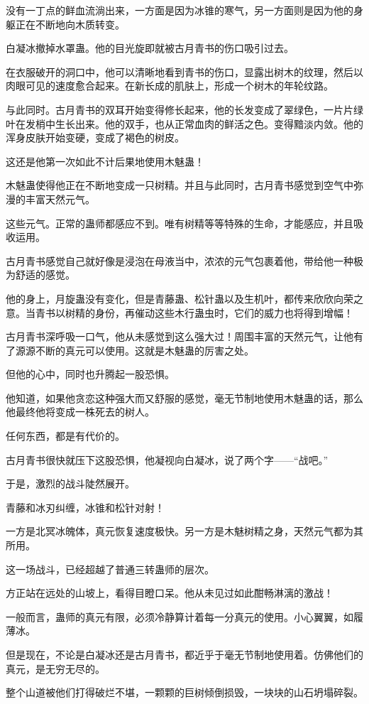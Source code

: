 \begin{this_body}
没有一丁点的鲜血流淌出来，一方面是因为冰锥的寒气，另一方面则是因为他的身躯正在不断地向木质转变。

白凝冰撤掉水罩蛊。他的目光旋即就被古月青书的伤口吸引过去。

在衣服破开的洞口中，他可以清晰地看到青书的伤口，显露出树木的纹理，然后以肉眼可见的速度愈合起来。在新长成的肌肤上，形成一个树木的年轮纹路。

与此同时。古月青书的双耳开始变得修长起来，他的长发变成了翠绿色，一片片绿叶在发梢中生长出来。他的双手，也从正常血肉的鲜活之色。变得黯淡内敛。他的浑身皮肤开始变硬，变成了褐色的树皮。

这还是他第一次如此不计后果地使用木魅蛊！

木魅蛊使得他正在不断地变成一只树精。并且与此同时，古月青书感觉到空气中弥漫的丰富天然元气。

这些元气。正常的蛊师都感应不到。唯有树精等等特殊的生命，才能感应，并且吸收运用。

古月青书感觉自己就好像是浸泡在母液当中，浓浓的元气包裹着他，带给他一种极为舒适的感觉。

他的身上，月旋蛊没有变化，但是青藤蛊、松针蛊以及生机叶，都传来欣欣向荣之意。当青书以树精的身份，再催动这些木行蛊虫时，它们的威力也将得到增幅！

古月青书深呼吸一口气，他从未感觉到这么强大过！周围丰富的天然元气，让他有了源源不断的真元可以使用。这就是木魅蛊的厉害之处。

但他的心中，同时也升腾起一股恐惧。

他知道，如果他贪恋这种强大而又舒服的感觉，毫无节制地使用木魅蛊的话，那么他最终他将变成一株死去的树人。

任何东西，都是有代价的。

古月青书很快就压下这股恐惧，他凝视向白凝冰，说了两个字——“战吧。”

于是，激烈的战斗陡然展开。

青藤和冰刃纠缠，冰锥和松针对射！

一方是北冥冰魄体，真元恢复速度极快。另一方是木魅树精之身，天然元气都为其所用。

这一场战斗，已经超越了普通三转蛊师的层次。

方正站在远处的山坡上，看得目瞪口呆。他从未见过如此酣畅淋漓的激战！

一般而言，蛊师的真元有限，必须冷静算计着每一分真元的使用。小心翼翼，如履薄冰。

但是现在，不论是白凝冰还是古月青书，都近乎于毫无节制地使用着。仿佛他们的真元，是无穷无尽的。

整个山道被他们打得破烂不堪，一颗颗的巨树倾倒损毁，一块块的山石坍塌碎裂。


\end{this_body}
